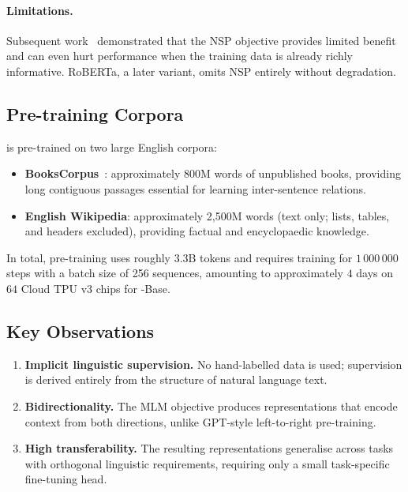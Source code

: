 \paragraph{Limitations.}  Subsequent work~\cite{liu2019roberta} demonstrated that
the NSP objective provides limited benefit and can even hurt performance when the
training data is already richly informative.  RoBERTa, a later variant, omits NSP
entirely without degradation.

\subsection{Pre-training Corpora}
\label{subsec:data}

\bert{} is pre-trained on two large English corpora:
\begin{itemize}
  \item \textbf{BooksCorpus}~\cite{zhu2015aligning}: approximately 800M words of
        unpublished books, providing long contiguous passages essential for learning
        inter-sentence relations.
  \item \textbf{English Wikipedia}: approximately 2,500M words (text only;
        lists, tables, and headers excluded), providing factual and encyclopaedic
        knowledge.
\end{itemize}
In total, pre-training uses roughly 3.3B tokens and requires training for
$1\,000\,000$ steps with a batch size of 256 sequences, amounting to approximately
$4$ days on $64$ Cloud TPU v3 chips for \bert{}-Base.

\subsection{Key Observations}
\label{subsec:pretrain_obs}

\begin{enumerate}
  \item \textbf{Implicit linguistic supervision.}  No hand-labelled data is used;
        supervision is derived entirely from the structure of natural language text.
  \item \textbf{Bidirectionality.}  The MLM objective produces representations
        that encode context from both directions, unlike GPT-style left-to-right
        pre-training.
  \item \textbf{High transferability.}  The resulting representations generalise
        across tasks with orthogonal linguistic requirements, requiring only a
        small task-specific fine-tuning head.
\end{enumerate}
